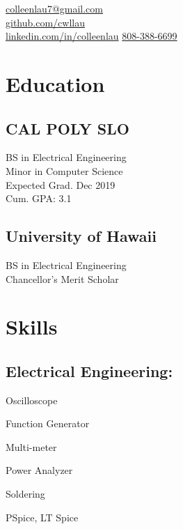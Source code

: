 \documentclass[]{hieudo-build}
\begin{document}
%
%
{
	\faEnvelope \href{mailto:colleenlau7@gmail.com}{ colleenlau7@gmail.com}\\
	\faGithub \href{https://github.com/cwllau}{   github.com/cwllau}\\
	\faLinkedinSquare \href{https://www.linkedin.com/in/colleenlau}
  {linkedin.com/in/colleenlau}
  \faPhone \href{https://github.com/cwllau}{ 808-388-6699}
}
    
%
%
\begin{minipage}[t]{0.34\textwidth} 

\section{Education} 

\subsection{CAL POLY SLO}
BS in Electrical Engineering \\
Minor in Computer Science \\
Expected Grad. Dec 2019 \\
Cum. GPA: 3.1\\
\sectionsep

\subsection{University of Hawaii}
BS in Electrical Engineering \\
Chancellor's Merit Scholar \\
\sectionsep

\section{Skills}

\subsection{Electrical Engineering:}
\vspace{0.7em} %
\begin{tightemize}
\setlength{\itemsep}{0pt}
\scriptsize{}
  \item Oscilloscope
  \item Function Generator
  \item Multi-meter
  \item Power Analyzer
  \item Soldering
  \item PSpice, LT Spice
\end{tightemize}


\end{minipage}
\end{document}
